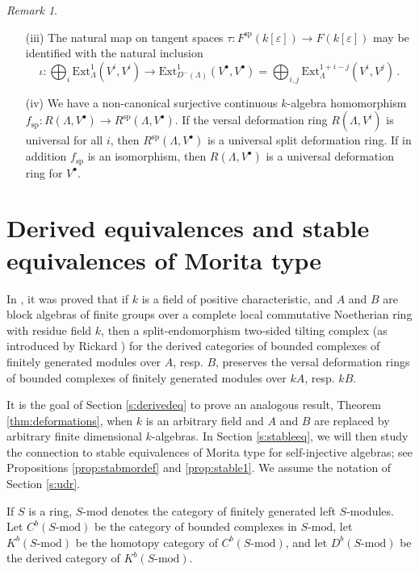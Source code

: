 \documentclass{amsart}
\theoremstyle{plain}
\theoremstyle{definition}
\theoremstyle{remark}
\newtheorem{rem}[thm]{Remark}
\begin{document}
\begin{rem}
\begin{enumerate}
\item[(iii)] 
The natural map on tangent spaces $\tau: F^{\mathrm{sp}}(k[\varepsilon]) \to F(k[\varepsilon])$ may be
identified with the natural inclusion
$$\iota: \bigoplus_i
 \mathrm{Ext}^1_{\Lambda}(V^i, V^i)
\to \mathrm{Ext}^1_{D^{-}(\Lambda)}(V^\bullet,V^\bullet) = \bigoplus_{i,j}\mathrm{Ext}^{1+i-j}_{
\Lambda}(V^i,V^j)\,.
$$

\item[(iv)]
We have a non-canonical surjective continuous $k$-algebra homomorphism 
$f_{\mathrm{sp}}:R(\Lambda,V^\bullet) \to R^{\mathrm{sp}}(\Lambda,V^\bullet)$.
If the versal deformation ring $R(\Lambda,V^i)$ is universal for all $i$,
then $R^{\mathrm{sp}}(\Lambda,V^\bullet)$ is a universal split deformation ring.  If in addition
$f_{\mathrm{sp}}$ is an isomorphism, then $R(\Lambda,V^\bullet)$ is a universal deformation ring for $V^\bullet$.
\end{enumerate}
\end{rem}

\section{Derived equivalences and stable equivalences of Morita type}
\label{s:derivedequivalences}
\setcounter{equation}{0}

In \cite{derivedeq}, it was proved that if $k$ is a field of positive characteristic, and
$A$ and $B$ are block algebras of finite groups over a complete local commutative 
Noetherian ring with residue field $k$, then a split-endomorphism
two-sided tilting complex (as introduced by Rickard \cite{rickard2}) for the derived categories
of bounded complexes of finitely generated modules over $A$, resp. $B$,
preserves the versal deformation rings of bounded complexes of finitely generated
modules over $kA$, resp. $kB$.

It is the goal of Section \ref{s:derivedeq} to prove an analogous result, Theorem \ref{thm:deformations}, 
when $k$ is  an arbitrary field and $A$ and $B$ are replaced by arbitrary finite dimensional $k$-algebras.
In Section \ref{s:stableeq}, we will then study the connection to stable equivalences of Morita type for
self-injective algebras; see Propositions \ref{prop:stabmordef} and \ref{prop:stable1}. We assume the notation of Section \ref{s:udr}.

If $S$ is a ring,  $S\mbox{-mod}$ denotes
the category of finitely generated left  $S$-modules. 
Let $C^b(S\mbox{-mod})$  be the category of bounded complexes in $S\mbox{-mod}$,
let $K^b(S\mbox{-mod})$ be the homotopy category of $C^b(S\mbox{-mod})$,
and let $D^b(S\mbox{-mod})$  be the derived category of $K^b(S\mbox{-mod})$.
\end{document}
